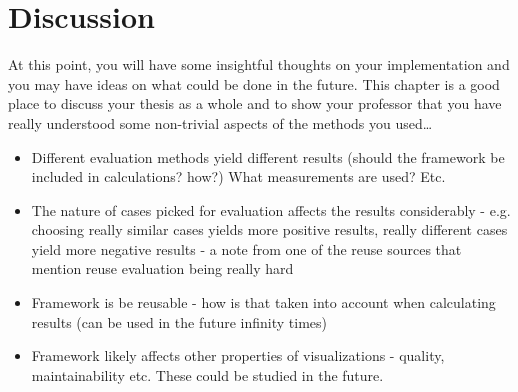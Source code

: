 
\chapter{Discussion}
\label{chapter:discussion}

At this point, you will have some insightful thoughts on your implementation
and you may have ideas on what could be done in the future. 
This chapter is a good place to discuss your thesis as a whole and to show your
professor that you have really understood some non-trivial aspects of the
methods you used\ldots

\begin{itemize}
	\item Different evaluation methods yield different results (should the framework be included in calculations? how?) What measurements are used? Etc.
	\item The nature of cases picked for evaluation affects the results considerably - e.g. choosing really similar cases yields more positive results, really different cases yield more negative results - a note from one of the reuse sources that mention reuse evaluation being really hard
	\item Framework is be reusable - how is that taken into account when calculating results (can be used in the future infinity times)
	\item Framework likely affects other properties of visualizations - quality, maintainability etc. These could be studied in the future.
\end{itemize}
